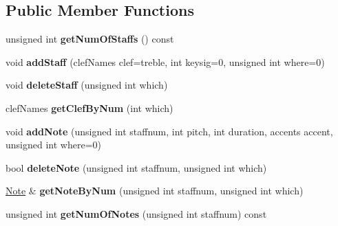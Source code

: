 \subsection*{Public Member Functions}
\begin{DoxyCompactItemize}
\item 
\hypertarget{class_score_view_model_a2e95a5f0786d42535d04eeaa173ef90f}{}unsigned int {\bfseries get\+Num\+Of\+Staffs} () const \label{class_score_view_model_a2e95a5f0786d42535d04eeaa173ef90f}

\item 
\hypertarget{class_score_view_model_aba57d53f1f981ed6426362e72f314112}{}void {\bfseries add\+Staff} (clef\+Names clef=treble, int keysig=0, unsigned int where=0)\label{class_score_view_model_aba57d53f1f981ed6426362e72f314112}

\item 
\hypertarget{class_score_view_model_a48ec38e418000ba3e1f69678eaedaeee}{}void {\bfseries delete\+Staff} (unsigned int which)\label{class_score_view_model_a48ec38e418000ba3e1f69678eaedaeee}

\item 
\hypertarget{class_score_view_model_a89a469259de6149a1eb88faaae00b0b2}{}clef\+Names {\bfseries get\+Clef\+By\+Num} (int which)\label{class_score_view_model_a89a469259de6149a1eb88faaae00b0b2}

\item 
\hypertarget{class_score_view_model_a72a684c084554c68762d70e5a7bbf09c}{}void {\bfseries add\+Note} (unsigned int staffnum, int pitch, int duration, accents accent, unsigned int where=0)\label{class_score_view_model_a72a684c084554c68762d70e5a7bbf09c}

\item 
\hypertarget{class_score_view_model_a68c1b40e40541dbfc0ffd2194ca5bcb4}{}bool {\bfseries delete\+Note} (unsigned int staffnum, unsigned int which)\label{class_score_view_model_a68c1b40e40541dbfc0ffd2194ca5bcb4}

\item 
\hypertarget{class_score_view_model_a36c92215c16d908f3fd69093e4d307aa}{}\hyperlink{class_note}{Note} \& {\bfseries get\+Note\+By\+Num} (unsigned int staffnum, unsigned int which)\label{class_score_view_model_a36c92215c16d908f3fd69093e4d307aa}

\item 
\hypertarget{class_score_view_model_afd65004f27e1f03a7aab8c1c9b6635e4}{}unsigned int {\bfseries get\+Num\+Of\+Notes} (unsigned int staffnum) const \label{class_score_view_model_afd65004f27e1f03a7aab8c1c9b6635e4}


\end{DoxyCompactItemize}
